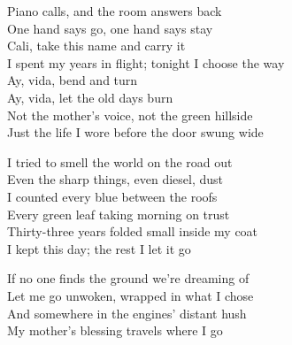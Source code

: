 \begin{lyrics}
Piano calls, and the room answers back\\
One hand says go, one hand says stay\\
Cali, take this name and carry it\\
I spent my years in flight; tonight I choose the way\\
Ay, vida, bend and turn\\
Ay, vida, let the old days burn\\
Not the mother’s voice, not the green hillside\\
Just the life I wore before the door swung wide

I tried to smell the world on the road out\\
Even the sharp things, even diesel, dust\\
I counted every blue between the roofs\\
Every green leaf taking morning on trust\\
Thirty-three years folded small inside my coat\\
I kept this day; the rest I let it go

If no one finds the ground we’re dreaming of\\
Let me go unwoken, wrapped in what I chose\\
And somewhere in the engines’ distant hush\\
My mother’s blessing travels where I go
\end{lyrics}


